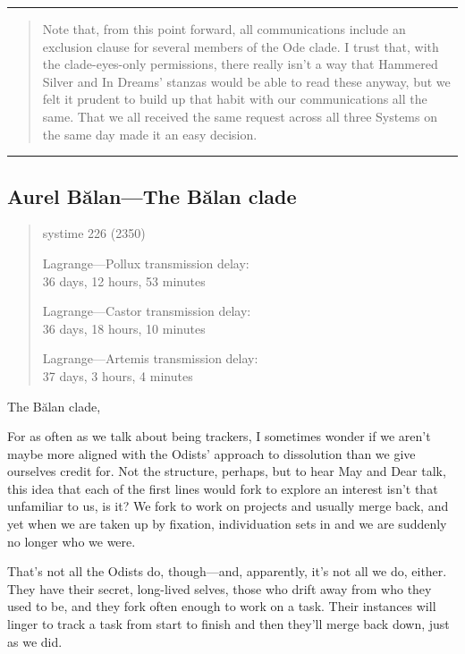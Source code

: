 \null
\vfill
\begin{center}\rule{0.5\linewidth}{0.5pt}\end{center}

\begin{quote}
Note that, from this point forward, all communications include an exclusion clause for several members of the Ode clade. I trust that, with the clade-eyes-only permissions, there really isn't a way that Hammered Silver and In Dreams' stanzas would be able to read these anyway, but we felt it prudent to build up that habit with our communications all the same. That we all received the same request across all three Systems on the same day made it an easy decision.
\end{quote}

\begin{center}\rule{0.5\linewidth}{0.5pt}\end{center}
\vfill
\newpage

\hypertarget{aurel-bux103lan-the-bux103lan-clade}{%
\subsection{Aurel Bălan—The Bălan clade}\label{aurel-bux103lan-the-bux103lan-clade}}

\begin{quote}
systime 226 (2350)

Lagrange---Pollux transmission delay:\\
36 days, 12 hours, 53 minutes

Lagrange---Castor transmission delay:\\
36 days, 18 hours, 10 minutes

Lagrange---Artemis transmission delay:\\
37 days, 3 hours, 4 minutes
\end{quote}

The Bălan clade,

For as often as we talk about being trackers, I sometimes wonder if we aren't maybe more aligned with the Odists' approach to dissolution than we give ourselves credit for. Not the structure, perhaps, but to hear May and Dear talk, this idea that each of the first lines would fork to explore an interest isn't that unfamiliar to us, is it? We fork to work on projects and usually merge back, and yet when we are taken up by fixation, individuation sets in and we are suddenly no longer who we were.

That's not all the Odists do, though—and, apparently, it's not all we do, either. They have their secret, long-lived selves, those who drift away from who they used to be, and they fork often enough to work on a task. Their instances will linger to track a task from start to finish and then they'll merge back down, just as we did.


